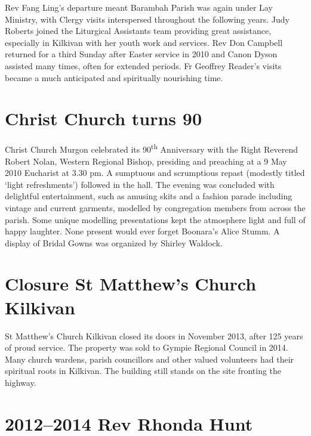 Rev Fang Ling's departure meant Barambah Parish was again under Lay Ministry, with Clergy visits interspersed throughout the following years. Judy Roberts joined the Liturgical Assistants team providing great assistance, especially in Kilkivan with her youth work and services. Rev Don Campbell returned for a third Sunday after Easter service in 2010 and Canon Dyson assisted many times, often for extended periods. Fr Geoffrey Reader's visits became a much anticipated and spiritually nourishing time.



\section{Christ Church turns 90}



Christ Church Murgon celebrated its 90\textsuperscript{th} Anniversary with the Right Reverend Robert Nolan, Western Regional Bishop, presiding and preaching at a 9 May 2010 Eucharist at 3.30 pm. A sumptuous and scrumptious repast (modestly titled `light refreshments') followed in the hall. The evening was concluded with delightful entertainment, such as amusing skits and a fashion parade including vintage and current garments, modelled by congregation members from across the parish. Some unique modelling presentations kept the atmosphere light and full of happy laughter. None present would ever forget Boonara's Alice Stumm. A display of Bridal Gowns was organized by Shirley Waldock.



\section{Closure St Matthew's Church Kilkivan}



St Matthew's Church Kilkivan closed its doors in November 2013, after 125 years of proud service. The property was sold to Gympie Regional Council in 2014. Many church wardens, parish councillors and other valued volunteers had their spiritual roots in Kilkivan. The building still stands on the site fronting the highway.



\section{2012--2014 Rev Rhonda Hunt}



